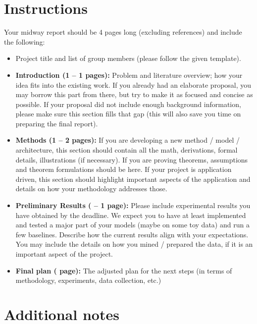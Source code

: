 \section*{Instructions}

Your midway report should be 4 pages long (excluding references) and include the following:

\begin{itemize}[leftmargin=2em]
    \item Project title and list of group members (please follow the given template).

    \item \textbf{Introduction (1 -- 1 pages):}
    Problem and literature overview; how your idea fits into the existing work.
    If you already had an elaborate proposal, you may borrow this part from there, but try to make it as focused and concise as possible.
    If your proposal did not include enough background information, please make sure this section fills that gap (this will also save you time on preparing the final report).

    \item \textbf{Methods (1 -- 2 pages):}
    If you are developing a new method / model / architecture, this section should contain all the math, derivations, formal details, illustrations (if necessary).
    If you are proving theorems, assumptions and theorem formulations should be here.
    If your project is application driven, this section should highlight important aspects of the application and details on how your methodology addresses those.

    \item \textbf{Preliminary Results ( -- 1 page):}
    Please include experimental results you have obtained by the deadline.
    We expect you to have at least implemented and tested a major part of your models (maybe on some toy data) and run a few baselines.
    Describe how the current results align with your expectations.
    You may include the details on how you mined / prepared the data, if it is an important aspect of the project.

    \item \textbf{Final plan ( page):}
    The adjusted plan for the next steps (in terms of methodology, experiments, data collection, etc.)
\end{itemize}

\section*{Additional notes}

